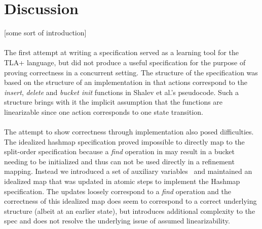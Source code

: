 \documentclass{uit-thesis}
\begin{document}
\section{Discussion}\label{sec:discussion}
[some sort of introduction]
\\\\
The first attempt at writing a specification served as a learning tool for the TLA+ language, but did not produce a useful specification for the purpose of proving correctness in a concurrent setting. The structure of the specification was based on the structure of an implementation in that actions correspond to the \textit{insert}, \textit{delete} and \textit{bucket init} functions in Shalev et al.'s pseudocode. Such a structure brings with it the implicit assumption that the functions are linearizable since one action corresponds to one state transition.
\\\\
The attempt to show correctness through implementation also posed difficulties. The idealized hashmap specification proved impossible to directly map to the split-order specification because a \textit{find} operation in may result in a bucket needing to be initialized and thus can not be used directly in a refinement mapping. Instead we introduced a set of auxiliary variables~\cite{Lamport2019a} and maintained an idealized map that was updated in atomic steps to implement the Hashmap specification. The updates loosely correspond to a \textit{find} operation and the correctness of this idealized map does seem to correspond to a correct underlying structure (albeit at an earlier state), but introduces additional complexity to the spec and does not resolve the underlying issue of assumed linearizability.

\backmatter
\printbibliography{}
\appendix
{}
\end{document}
